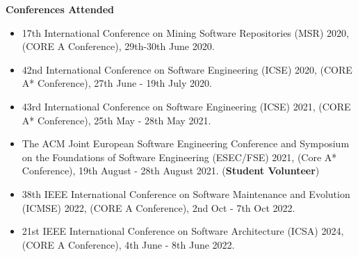 \documentclass[12pt,table,xcdraw]{article}
\begin{document}
\textbf{Conferences Attended}
\begin{itemize}
    \item 17th International Conference on Mining Software Repositories (MSR) 2020, (CORE A Conference), 29th-30th June 2020.
    \item 42nd International Conference on Software Engineering (ICSE) 2020, (CORE A* Conference), 27th June - 19th July 2020.
    \item 43rd International Conference on Software Engineering (ICSE) 2021, (CORE A* Conference), 25th May - 28th May 2021.
    \item The ACM Joint European Software Engineering Conference and Symposium on the Foundations of Software Engineering (ESEC/FSE) 2021, (Core A* Conference), 19th August - 28th August 2021. (\textbf{Student Volunteer})
    \item 38th IEEE International Conference on Software Maintenance and Evolution (ICMSE) 2022, (CORE A Conference), 2nd Oct - 7th Oct 2022.
    \item 21st IEEE International Conference on Software Architecture (ICSA) 2024, (CORE A Conference), 4th June - 8th June 2022.
\end{itemize}
\end{document}
